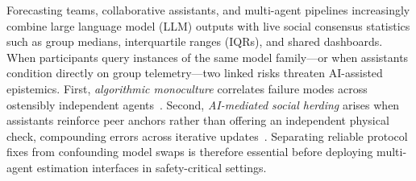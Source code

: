 \documentclass[11pt,letterpaper]{article}
\theoremstyle{plain}
\begin{document}
Forecasting teams, collaborative assistants, and multi-agent pipelines increasingly combine large language model (LLM) outputs with live social consensus statistics such as group medians, interquartile ranges (IQRs), and shared dashboards. When participants query instances of the same model family---or when assistants condition directly on group telemetry---two linked risks threaten AI-assisted epistemics. First, \emph{algorithmic monoculture} correlates failure modes across ostensibly independent agents~\citep{kleinberg2021algorithmic,kim2025correlated,jiang2025artificial}. Second, \emph{AI-mediated social herding} arises when assistants reinforce peer anchors rather than offering an independent physical check, compounding errors across iterative updates~\citep{demarzo2003persuasion,denisov2026consensus}. Separating reliable protocol fixes from confounding model swaps is therefore essential before deploying multi-agent estimation interfaces in safety-critical settings.
\end{document}
